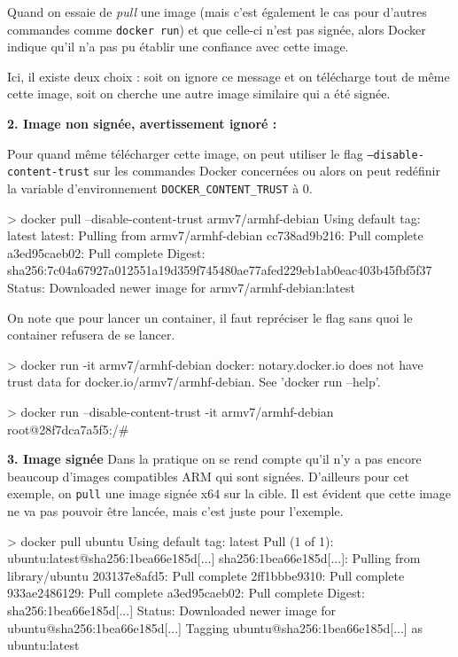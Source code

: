 \documentclass[11pt,a4paper,oneside]{report}
\newcommand{\code}[1]{\texttt{#1}}
\begin{document}
Quand on essaie de \textit{pull} une image (mais c'est également le cas pour d'autres commandes comme \code{docker run}) et que celle-ci n'est pas signée, alors Docker indique qu'il n'a pas pu établir une confiance avec cette image.

Ici, il existe deux choix : soit on ignore ce message et on télécharge tout de même cette image, soit on cherche une autre image similaire qui a été signée.

\textbf{2. Image non signée, avertissement ignoré :}

Pour quand même télécharger cette image, on peut utiliser le flag \code{--disable-content-trust} sur les commandes Docker concernées ou alors on peut redéfinir la variable d'environnement \code{DOCKER\_CONTENT\_TRUST} à 0.

\begin{textcode}
> docker pull --disable-content-trust armv7/armhf-debian
Using default tag: latest
latest: Pulling from armv7/armhf-debian
cc738ad9b216: Pull complete 
a3ed95caeb02: Pull complete 
Digest: sha256:7c04a67927a012551a19d359f745480ae77afed229eb1ab0eac403b45fbf5f37
Status: Downloaded newer image for armv7/armhf-debian:latest
\end{textcode}

On note que pour lancer un container, il faut repréciser le flag sans quoi le container refusera de se lancer.

\begin{textcode}
> docker run -it armv7/armhf-debian
docker: notary.docker.io does not have trust data for docker.io/armv7/armhf-debian.
See 'docker run --help'.
\end{textcode}

\begin{textcode}
> docker run --disable-content-trust -it armv7/armhf-debian
root@28f7dca7a5f5:/# 
\end{textcode}

\textbf{3. Image signée}
Dans la pratique on se rend compte qu'il n'y a pas encore beaucoup d'images compatibles ARM qui sont signées. D'ailleurs pour cet exemple, on \code{pull} une image signée x64 sur la cible. Il est évident que cette image ne va pas pouvoir être lancée, mais c'est juste pour l'exemple.

\begin{textcode}
> docker pull ubuntu
Using default tag: latest
Pull (1 of 1): ubuntu:latest@sha256:1bea66e185d[...]
sha256:1bea66e185d[...]: Pulling from library/ubuntu
203137e8afd5: Pull complete 
2ff1bbbe9310: Pull complete 
933ae2486129: Pull complete 
a3ed95caeb02: Pull complete 
Digest: sha256:1bea66e185d[...]
Status: Downloaded newer image for ubuntu@sha256:1bea66e185d[...]
Tagging ubuntu@sha256:1bea66e185d[...] as ubuntu:latest
\end{textcode}
\end{document}
